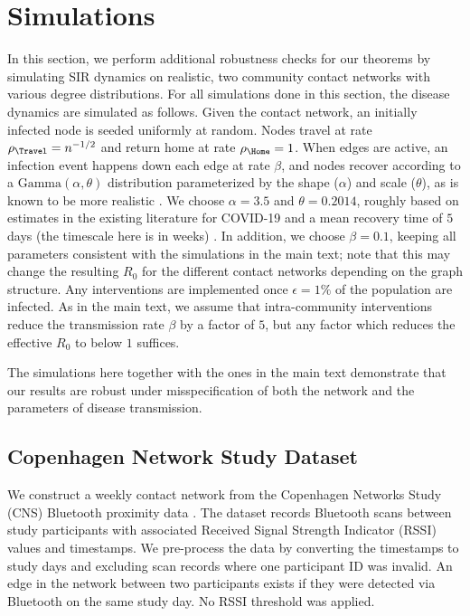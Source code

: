 \documentclass[11pt]{article}
\begin{document}
\section{Simulations}
In this section, we perform additional robustness checks for our theorems by simulating SIR dynamics on realistic, two community contact networks with various degree distributions. For all simulations done in this section, the disease dynamics are simulated as follows. Given the contact network, an initially infected node is seeded uniformly at random. Nodes travel at rate $\rho_\Travel = n^{-1/2}$ and return home at rate $\rho_\Home = 1$. When edges are active, an infection event happens down each edge at rate $\beta$, and nodes recover according to a $\mathrm{Gamma}(\alpha, \theta)$ distribution parameterized by the shape ($\alpha$) and scale ($\theta$), as is known to be more realistic \cite{wearing2005appropriate, lloyd2001realistic}.  We choose $\alpha = 3.5$ and $\theta = 0.2014$, roughly based on estimates in the existing literature for COVID-19 and a mean recovery time of $5$ days (the timescale here is in weeks) \cite{sender2022unmitigated, kremer2022serial}. In addition, we choose $\beta = 0.1$, keeping all parameters consistent with the simulations in the main text; note that this may change the resulting $R_0$ for the different contact networks depending on the graph structure. Any interventions are implemented once $\epsilon = 1\%$ of the population are infected. As in the main text, we assume that intra-community interventions reduce the transmission rate $\beta$ by a factor of $5$, but any factor which reduces the effective $R_0$ to below $1$ suffices.  

The simulations here together with the ones in the main text demonstrate that our results are robust under misspecification of both the network and the parameters of disease transmission. 

\subsection{Copenhagen Network Study Dataset}

We construct a weekly contact network from the Copenhagen Networks Study (CNS) Bluetooth proximity data \cite{sapiezynski2019interaction, sapiezynski2019data}. The dataset records Bluetooth scans between study participants with associated Received Signal Strength Indicator (RSSI) values and timestamps. We pre-process the data by converting the timestamps to study days and excluding scan records where one participant ID was invalid. An edge in the network between two participants exists if they were detected via Bluetooth on the same study day. No RSSI threshold was applied. 
\end{document}
